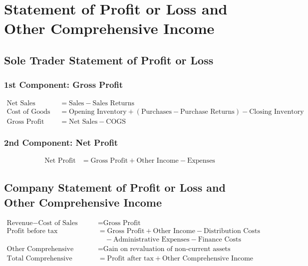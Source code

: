 \section{Statement of Profit or Loss and Other Comprehensive Income}

\subsection{Sole Trader Statement of Profit or Loss}

\subsubsection{1st Component: Gross Profit} 
\begin{align*}
\text{Net Sales} &= \text{Sales} - \text{Sales Returns} \\
\text{Cost of Goods Sold (COGS)} &= \text{Opening Inventory} + (\text{Purchases} - \text{Purchase Returns}) - \text{Closing Inventory} \\
\text{Gross Profit} &= \text{Net Sales} - \text{COGS}
\end{align*}

\subsubsection{2nd Component: Net Profit}
\begin{align*}
\text{Net Profit} &= \text{Gross Profit} + \text{Other Income} - \text{Expenses}
\end{align*}

\subsection{Company Statement of Profit or Loss and Other Comprehensive Income}
\begin{align*}
\text{Revenue} - \text{Cost of Sales} &= \text{Gross Profit} \\
\text{Profit before tax} &= \text{Gross Profit} + \text{Other Income} - \text{Distribution Costs} \\
&\quad - \text{Administrative Expenses} - \text{Finance Costs} \\
\text{Other Comprehensive Income} &= \text{Gain on revaluation of non-current assets} \\
\text{Total Comprehensive Income} &= \text{Profit after tax} + \text{Other Comprehensive Income}
\end{align*}

